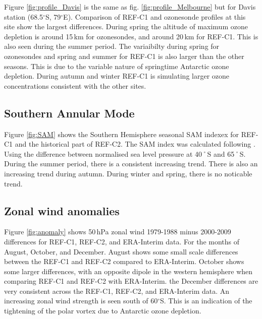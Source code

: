Figure \ref{fig:profile_Davis} is the same as fig. \ref{fig:profile_Melbourne} but for Davis station (68.5$^\circ$S, 79$^\circ$E). Comparison of REF-C1 and ozonesonde profiles at this site show the largest differences. During spring the altitude of maximum ozone depletion is around 15\,km for ozonesondes, and around 20\,km for REF-C1. This is also seen during the summer period. The variaibilty during spring for ozonesondes and spring and summer for REF-C1 is also larger than the other seasons. This is due to the variable nature of springtime Antarctic ozone depletion. During autumn and winter REF-C1 is simulating larger ozone concentrations consistent with the other sites. 

\subsection{Southern Annular Mode}
Figure \ref{fig:SAM} shows the Southern Hemisphere seasonal SAM indexex for REF-C1 and the historical part of REF-C2.  The SAM index was calculated following \citep{DaoyiGong:2007vm}. Using the difference between normalised sea level pressure at 40˚S and 65˚S. During the summer period, there is a consistent increasing trend. There is also an increasing trend during autumn. During winter and spring, there is no noticable trend.

\subsection{Zonal wind anomalies}
Figure \ref{fig:anomaly} shows 50\,hPa zonal wind 1979-1988 minus 2000-2009 differences for REF-C1, REF-C2, and ERA-Interim data. For the months of August, October, and December. August shows some small scale differences between the REF-C1 and REF-C2 compared to ERA-Interim. October shows some larger differences, with an opposite dipole in the western hemisphere when comparing REF-C1 and REF-C2 with ERA-Interim. the December differences are very consistent across the REF-C1, REF-C2, and ERA-Interim data. An increasing zonal wind strength is seen south of 60$^\circ$S. This is an indication of the tightening of the polar vortex due to Antarctic ozone depletion.
